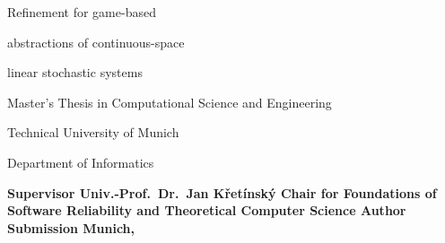 \startalignment[flushright]
    \dontleavehmode
\stopalignment

\blank[25mm]

{ \CoverTitleFont
    \strut Refinement for game-based\blank[4mm]
    \strut abstractions of continuous-space \blank[4mm]
    \strut linear stochastic systems
}

\blank[100mm]

Master's Thesis in Computational Science and Engineering

Technical University of Munich

Department of Informatics

\blank[20mm]

\starttable[s0|lp(35mm)|lp(115mm)|]
    \NC \bf Supervisor \NC Univ.-Prof.\ Dr.\ Jan Křetínský \NC \AR
    \NC \NC Chair for Foundations of Software Reliability and 
    Theoretical Computer Science \NC \AR
    \SR
    \NC \bf Author \NC \Author \NC \AR
    \SR
    \NC \bf Submission \NC Munich, \DateOfCompletion \NC \AR
\stoptable

